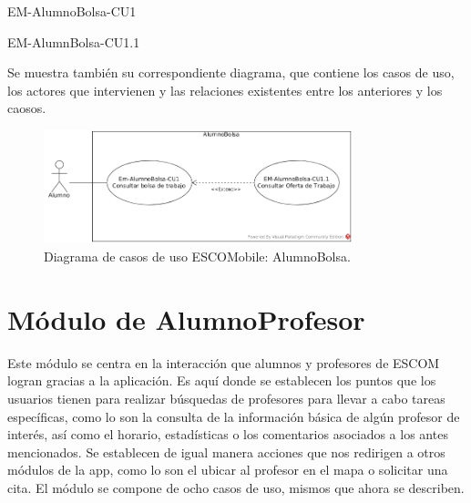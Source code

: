 \begin{requisitos}{EM-AlumnoBolsa-CU1}
\end{requisitos}

\begin{requisitos}{EM-AlumnBolsa-CU1.1}
\end{requisitos}

\noindent
Se muestra también su correspondiente diagrama, que contiene los casos de uso, los actores que intervienen
y las relaciones existentes entre los anteriores y los caosos. 

\begin{figure}[htbp!]
	\centering
	\includegraphics[width=0.8\textwidth]{images/casos/alumnoBolsa}
	\caption{Diagrama de casos de uso ESCOMobile: AlumnoBolsa.}
\end{figure}

\newpage




\section{Módulo de AlumnoProfesor}

\noindent
Este módulo se centra en la interacción que alumnos y profesores de ESCOM logran gracias a la aplicación.
Es aquí donde se establecen los puntos que los usuarios tienen para realizar búsquedas de profesores para
llevar a cabo tareas específicas, como lo son la consulta de la información básica de algún profesor de
interés, así como el horario, estadísticas o los comentarios asociados a los antes mencionados. Se establecen
de igual manera acciones que nos redirigen a otros módulos de la app, como lo son el ubicar al profesor en el
mapa o solicitar una cita. 
El módulo se compone de ocho casos de uso, mismos que ahora se describen.

